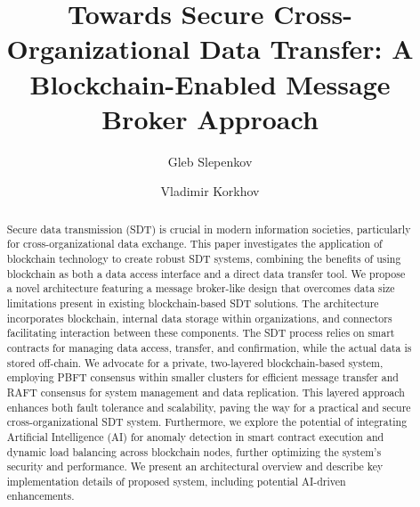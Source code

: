 \documentclass[10pt]{llncs}
\begin{document}
\title{Towards Secure Cross-Organizational Data Transfer: A Blockchain-Enabled Message Broker Approach}
\author{Gleb Slepenkov\and Vladimir Korkhov}

\maketitle

\begin{abstract}
    Secure data transmission (SDT) is crucial in modern information societies, particularly for cross-organizational data exchange. 
    This paper investigates the application of blockchain technology to create robust SDT systems, combining the benefits of using blockchain as both a data access interface and a direct data transfer tool. 
    We propose a novel architecture featuring a message broker-like design that overcomes data size limitations present in existing blockchain-based SDT solutions. 
    The architecture incorporates blockchain, internal data storage within organizations, and connectors facilitating interaction between these components. 
    The SDT process relies on smart contracts for managing data access, transfer, and confirmation, while the actual data is stored off-chain. 
    We advocate for a private, two-layered blockchain-based system, employing PBFT consensus within smaller clusters for efficient message transfer and RAFT consensus for system management and data replication. 
    This layered approach enhances both fault tolerance and scalability, paving the way for a practical and secure cross-organizational SDT system.
    Furthermore, we explore the potential of integrating Artificial Intelligence (AI) for anomaly detection in smart contract execution and dynamic load balancing across blockchain nodes, further optimizing the system's security and performance.
    We present an architectural overview and describe key implementation details of proposed system, including potential AI-driven enhancements.
    
\end{abstract}
\end{document}
